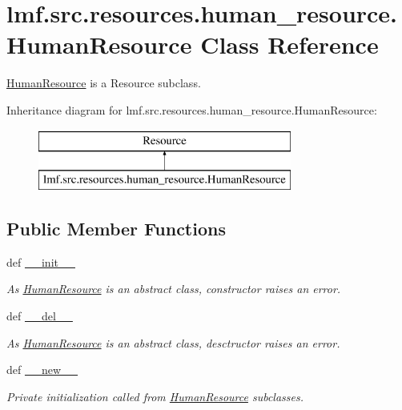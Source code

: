 \hypertarget{classlmf_1_1src_1_1resources_1_1human__resource_1_1_human_resource}{\section{lmf.\+src.\+resources.\+human\+\_\+resource.\+Human\+Resource Class Reference}
\label{classlmf_1_1src_1_1resources_1_1human__resource_1_1_human_resource}
}


\hyperlink{classlmf_1_1src_1_1resources_1_1human__resource_1_1_human_resource}{Human\+Resource} is a Resource subclass.  


Inheritance diagram for lmf.\+src.\+resources.\+human\+\_\+resource.\+Human\+Resource\+:\begin{figure}[H]
\begin{center}
\leavevmode
\includegraphics[height=2.000000cm]{classlmf_1_1src_1_1resources_1_1human__resource_1_1_human_resource}
\end{center}
\end{figure}
\subsection*{Public Member Functions}
\begin{DoxyCompactItemize}
\item 
def \hyperlink{classlmf_1_1src_1_1resources_1_1human__resource_1_1_human_resource_a46e116543c9cb199fb4627f25e82a3e1}{\+\_\+\+\_\+init\+\_\+\+\_\+}
\begin{DoxyCompactList}\small\item\em As \hyperlink{classlmf_1_1src_1_1resources_1_1human__resource_1_1_human_resource}{Human\+Resource} is an abstract class, constructor raises an error. \end{DoxyCompactList}\item 
def \hyperlink{classlmf_1_1src_1_1resources_1_1human__resource_1_1_human_resource_a73c9eb976edf10f261b7504e6183319a}{\+\_\+\+\_\+del\+\_\+\+\_\+}
\begin{DoxyCompactList}\small\item\em As \hyperlink{classlmf_1_1src_1_1resources_1_1human__resource_1_1_human_resource}{Human\+Resource} is an abstract class, desctructor raises an error. \end{DoxyCompactList}\item 
def \hyperlink{classlmf_1_1src_1_1resources_1_1human__resource_1_1_human_resource_a091c687c865e89d52ac36b00c1ec32c5}{\+\_\+\+\_\+new\+\_\+\+\_\+}
\begin{DoxyCompactList}\small\item\em Private initialization called from \hyperlink{classlmf_1_1src_1_1resources_1_1human__resource_1_1_human_resource}{Human\+Resource} subclasses. \end{DoxyCompactList}\end{DoxyCompactItemize}
